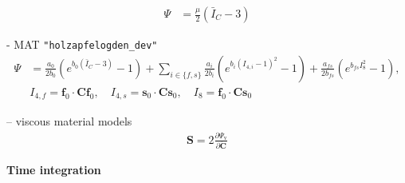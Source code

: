 \documentclass[a4paper,12pt]{report}
\newcommand{\bs}[1]{\boldsymbol{#1}}
\begin{document}
\begin{equation}
\begin{aligned}
\mathit{\Psi} &= \frac{\mu}{2}\left(\bar{I}_C - 3\right)
\end{aligned}
\end{equation}


- MAT \verb."holzapfelogden_dev".\\
\begin{equation}
\begin{aligned}
\mathit{\Psi} &= \frac{a_0}{2b_0}\left(e^{b_0(\bar{I}_C - 3)} - 1\right) + \sum\limits_{i\in\{f,s\}}\frac{a_i}{2b_i}\left(e^{b_i(I_{4,i}-1)^2}-1\right) + \frac{a_{fs}}{2b_{fs}}\left(e^{b_{fs}I_{8}^2} - 1\right), \\ & I_{4,f} = \bs{f}_0 \cdot \bs{C}\bs{f}_0, \quad I_{4,s} = \bs{s}_0 \cdot \bs{C}\bs{s}_0, \quad I_8 = \bs{f}_0 \cdot \bs{C}\bs{s}_0
\end{aligned}
\end{equation}

-- viscous material models
\begin{equation}
\begin{aligned}
\bs{S} = 2\frac{\partial\mathit{\Psi}_{\mathrm{v}}}{\partial \dot{\bs{C}}}
\end{aligned}
\end{equation}

\textbf{Time integration}\\
\end{document}
